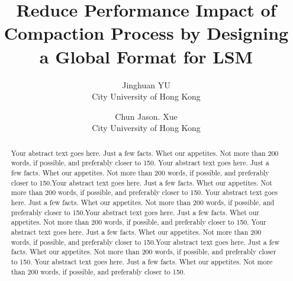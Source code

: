 \usepackage{filecontents}




\date{}

\title{\Large \bf Reduce Performance Impact of Compaction Process by Designing a Global Format for LSM}

\author{
{\rm Jinghuan YU}\\
City University of Hong Kong
\and
{\rm Chun Jason. Xue}\\
City University of Hong Kong
} %

\maketitle

\begin{abstract}
Your abstract text goes here. Just a few facts. Whet our appetites.
Not more than 200 words, if possible, and preferably closer to 150.
Your abstract text goes here. Just a few facts. Whet our appetites.
Not more than 200 words, if possible, and preferably closer to 150.Your abstract text goes here. Just a few facts. Whet our appetites.
Not more than 200 words, if possible, and preferably closer to 150.
Your abstract text goes here. Just a few facts. Whet our appetites.
Not more than 200 words, if possible, and preferably closer to 150.Your abstract text goes here. Just a few facts. Whet our appetites.
Not more than 200 words, if possible, and preferably closer to 150.
Your abstract text goes here. Just a few facts. Whet our appetites.
Not more than 200 words, if possible, and preferably closer to 150.Your abstract text goes here. Just a few facts. Whet our appetites.
Not more than 200 words, if possible, and preferably closer to 150.
Your abstract text goes here. Just a few facts. Whet our appetites.
Not more than 200 words, if possible, and preferably closer to 150.
\end{abstract}


